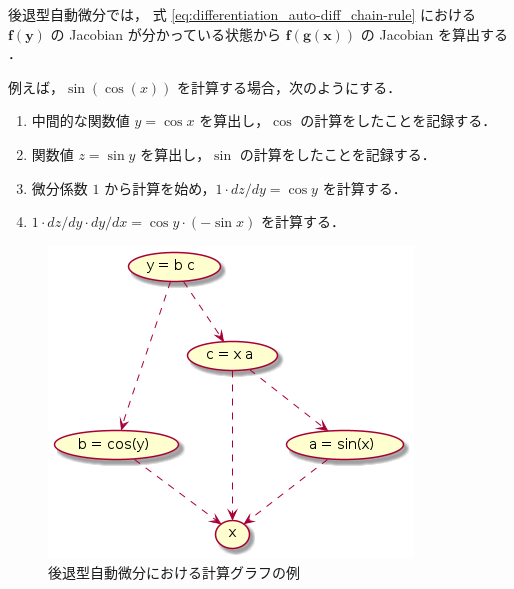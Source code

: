 後退型自動微分では，
式 \eqref{eq:differentiation_auto-diff_chain-rule} における
$\bm{f}(\bm{y})$ の Jacobian が分かっている状態から
$\bm{f}(\bm{g}(\bm{x}))$ の Jacobian を算出する
\cite{Kubota1998}．

例えば，$\sin(\cos(x))$ を計算する場合，次のようにする．

\begin{enumerate}
    \item 中間的な関数値 $y = \cos{x}$ を算出し，$\cos$ の計算をしたことを記録する．
    \item 関数値 $z = \sin{y}$ を算出し，$\sin$ の計算をしたことを記録する．
    \item 微分係数 $1$ から計算を始め，$1 \cdot dz/dy = \cos{y}$ を計算する．
    \item $1 \cdot dz/dy \cdot dy/dx = \cos{y} \cdot (-\sin{x})$ を計算する．
\end{enumerate}

\begin{figure}[tp]
    \centering
    \includegraphics[width=0.5\linewidth]{differentiation/auto-diff-backward/example-nodes.png}
    \caption{後退型自動微分における計算グラフの例}
    \label{fig:differentiation_auto-diff_backward-nodes-example}
\end{figure}

